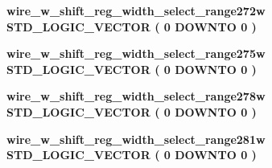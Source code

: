 \begin{DoxyCompactItemize}
{\bf wire\+\_\+w\+\_\+shift\+\_\+reg\+\_\+width\+\_\+select\+\_\+range272w} {\bfseries \textcolor{comment}{S\+T\+D\+\_\+\+L\+O\+G\+I\+C\+\_\+\+V\+E\+C\+T\+OR}\textcolor{vhdlchar}{ }\textcolor{vhdlchar}{(}\textcolor{vhdlchar}{ }\textcolor{vhdlchar}{ } \textcolor{vhdldigit}{0} \textcolor{vhdlchar}{ }\textcolor{keywordflow}{D\+O\+W\+N\+TO}\textcolor{vhdlchar}{ }\textcolor{vhdlchar}{ } \textcolor{vhdldigit}{0} \textcolor{vhdlchar}{ }\textcolor{vhdlchar}{)}\textcolor{vhdlchar}{ }} 
\item 
{\bf wire\+\_\+w\+\_\+shift\+\_\+reg\+\_\+width\+\_\+select\+\_\+range275w} {\bfseries \textcolor{comment}{S\+T\+D\+\_\+\+L\+O\+G\+I\+C\+\_\+\+V\+E\+C\+T\+OR}\textcolor{vhdlchar}{ }\textcolor{vhdlchar}{(}\textcolor{vhdlchar}{ }\textcolor{vhdlchar}{ } \textcolor{vhdldigit}{0} \textcolor{vhdlchar}{ }\textcolor{keywordflow}{D\+O\+W\+N\+TO}\textcolor{vhdlchar}{ }\textcolor{vhdlchar}{ } \textcolor{vhdldigit}{0} \textcolor{vhdlchar}{ }\textcolor{vhdlchar}{)}\textcolor{vhdlchar}{ }} 
\item 
{\bf wire\+\_\+w\+\_\+shift\+\_\+reg\+\_\+width\+\_\+select\+\_\+range278w} {\bfseries \textcolor{comment}{S\+T\+D\+\_\+\+L\+O\+G\+I\+C\+\_\+\+V\+E\+C\+T\+OR}\textcolor{vhdlchar}{ }\textcolor{vhdlchar}{(}\textcolor{vhdlchar}{ }\textcolor{vhdlchar}{ } \textcolor{vhdldigit}{0} \textcolor{vhdlchar}{ }\textcolor{keywordflow}{D\+O\+W\+N\+TO}\textcolor{vhdlchar}{ }\textcolor{vhdlchar}{ } \textcolor{vhdldigit}{0} \textcolor{vhdlchar}{ }\textcolor{vhdlchar}{)}\textcolor{vhdlchar}{ }} 
\item 
{\bf wire\+\_\+w\+\_\+shift\+\_\+reg\+\_\+width\+\_\+select\+\_\+range281w} {\bfseries \textcolor{comment}{S\+T\+D\+\_\+\+L\+O\+G\+I\+C\+\_\+\+V\+E\+C\+T\+OR}\textcolor{vhdlchar}{ }\textcolor{vhdlchar}{(}\textcolor{vhdlchar}{ }\textcolor{vhdlchar}{ } \textcolor{vhdldigit}{0} \textcolor{vhdlchar}{ }\textcolor{keywordflow}{D\+O\+W\+N\+TO}\textcolor{vhdlchar}{ }\textcolor{vhdlchar}{ } \textcolor{vhdldigit}{0} \textcolor{vhdlchar}{ }\textcolor{vhdlchar}{)}\textcolor{vhdlchar}{ }} 
\end{DoxyCompactItemize}
